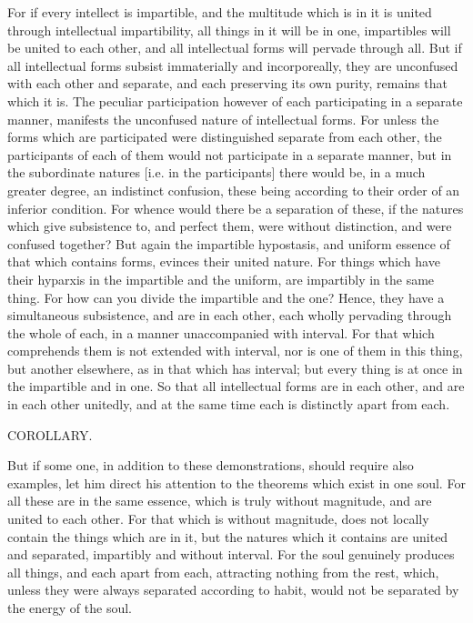 \documentclass[12pt]{article}
\begin{document}
For if every intellect is impartible, and the multitude which is in it is united through intellectual impartibility, all things in it will be in one, impartibles will be united to each other, and all intellectual forms will pervade through all. But if all intellectual forms subsist immaterially and incorporeally, they are unconfused with each other and separate, and each preserving its own purity, remains that which it is. The peculiar participation however of each participating in a separate manner, manifests the unconfused nature of intellectual forms. For unless the forms which are participated were distinguished separate from each other, the participants of each of them would not participate in a separate manner, but in the subordinate natures [i.e. in the participants] there would be, in a much greater degree, an indistinct confusion, these being according to their order of an inferior condition. For whence would there be a separation of these, if the natures which give subsistence to, and perfect them, were without distinction, and were confused together? But again the impartible hypostasis, and uniform essence of that which contains forms, evinces their united nature. For things which have their hyparxis in the impartible and the uniform, are impartibly in the same thing. For how can you divide the impartible and the one? Hence, they have a simultaneous subsistence, and are in each other, each wholly pervading through the whole of each, in a manner unaccompanied with interval. For that which comprehends them is not extended with interval, nor is one of them in this thing, but another elsewhere, as in that which has interval; but every thing is at once in the impartible and in one. So that all intellectual forms are in each other, and are in each other unitedly, and at the same time each is distinctly apart from each.

COROLLARY.

But if some one, in addition to these demonstrations, should require also examples, let him direct his attention to the theorems which exist in one soul. For all these are in the same essence, which is truly without magnitude, and are united to each other. For that which is without magnitude, does not locally contain the things which are in it, but the natures which it contains are united and separated, impartibly and without interval. For the soul genuinely produces all things, and each apart from each, attracting nothing from the rest, which, unless they were always separated according to habit, would not be separated by the energy of the soul.
\end{document}
